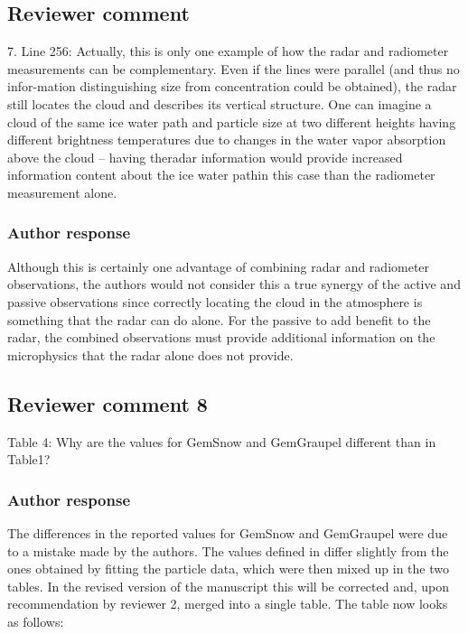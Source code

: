 \documentclass[11pt]{scrartcl}
\begin{document}
\begin{itemize}
\subsection{Reviewer comment}
7.  Line 256:  Actually, this is only one example of how the radar and radiometer measurements can be complementary.  Even if the lines were parallel (and thus no infor-mation distinguishing size from concentration could be obtained), the radar still locates the cloud and describes its vertical structure.  One can imagine a cloud of the same ice water path and particle size at two different heights having different brightness temperatures due to changes in the water vapor absorption above the cloud – having theradar information would provide increased information content about the ice water pathin this case than the radiometer measurement alone.

\subsubsection*{Author response}
Although this is certainly one advantage of combining radar and radiometer
observations, the authors would not consider this a true synergy of the active
and passive observations since correctly locating the cloud in the atmosphere is
something that the radar can do alone. For the passive to add benefit to the
radar, the combined observations must provide additional information on the
microphysics that the radar alone does not provide.


\subsection*{Reviewer comment 8}
Table 4: Why are the values for GemSnow and GemGraupel different than in Table1?

\subsubsection*{Author response}

The differences in the reported values for GemSnow and GemGraupel were due to a mistake
made by the authors. The values defined in \citet{milbrandtyau05} differ slightly from
the ones obtained by fitting the particle data, which were then mixed up in the two tables.
In the revised version of the manuscript this will be corrected and, upon recommendation
by reviewer 2, merged into a single table. The table now looks as follows:


\end{itemize}
\end{document}
